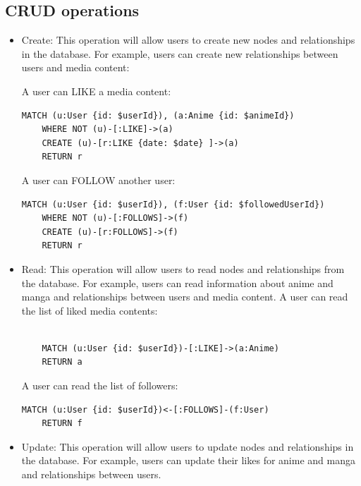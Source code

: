 \newpage

\subsection{CRUD operations}

\begin{itemize}
    \item Create: This operation will allow users to create new nodes and relationships in the database. For example, users can create new relationships between users and media content:
    
    A user can LIKE a media content: 
    \begin{lstlisting}[language=Cypher, caption=Create Like Relationship]
    MATCH (u:User {id: $userId}), (a:Anime {id: $animeId}) 
    WHERE NOT (u)-[:LIKE]->(a) 
    CREATE (u)-[r:LIKE {date: $date} ]->(a)
    RETURN r
    \end{lstlisting}

    A user can FOLLOW another user:
    \begin{lstlisting}[language=Cypher, caption=Create Follow Relationship]
    MATCH (u:User {id: $userId}), (f:User {id: $followedUserId}) 
    WHERE NOT (u)-[:FOLLOWS]->(f) 
    CREATE (u)-[r:FOLLOWS]->(f) 
    RETURN r
    \end{lstlisting}

    \item Read: This operation will allow users to read nodes and relationships from the database. For example, users can read information about anime and manga and relationships between users and media content.
    A user can read the list of liked media contents:
    \begin{lstlisting}[language=Cypher, caption=Read Liked Media Contents]
  
    MATCH (u:User {id: $userId})-[:LIKE]->(a:Anime)
    RETURN a
    \end{lstlisting}

    A user can read the list of followers:
    \begin{lstlisting}[language=Cypher, caption=Read Followers]
    MATCH (u:User {id: $userId})<-[:FOLLOWS]-(f:User)
    RETURN f
    \end{lstlisting}
  
    \item Update: This operation will allow users to update nodes and relationships in the database. For example, users can update their likes for anime and manga and relationships between users.
    

\end{itemize}

